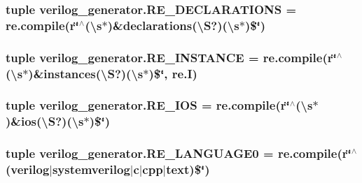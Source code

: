 \hypertarget{namespaceverilog__generator_a17458264d0df5cb836d925e8cf2ec56f}{
\subsubsection[{R\-E\-\_\-\-D\-E\-C\-L\-A\-R\-A\-T\-I\-O\-N\-S}]{\setlength{\rightskip}{0pt plus 5cm}tuple verilog\-\_\-generator.\-R\-E\-\_\-\-D\-E\-C\-L\-A\-R\-A\-T\-I\-O\-N\-S = re.\-compile(r\char`\"{}$^\wedge$(\textbackslash{}s$\ast$)\&declarations(\textbackslash{}S?)(\textbackslash{}s$\ast$)\$\char`\"{})}}\label{namespaceverilog__generator_a17458264d0df5cb836d925e8cf2ec56f}
\hypertarget{namespaceverilog__generator_ac2a164628a1ed9048df4807c3e001bd2}{
\subsubsection[{R\-E\-\_\-\-I\-N\-S\-T\-A\-N\-C\-E}]{\setlength{\rightskip}{0pt plus 5cm}tuple verilog\-\_\-generator.\-R\-E\-\_\-\-I\-N\-S\-T\-A\-N\-C\-E = re.\-compile(r\char`\"{}$^\wedge$(\textbackslash{}s$\ast$)\&{\bf instances}(\textbackslash{}S?)(\textbackslash{}s$\ast$)\$\char`\"{}, re.\-I)}}\label{namespaceverilog__generator_ac2a164628a1ed9048df4807c3e001bd2}
\hypertarget{namespaceverilog__generator_ac53d8e583f512c430c2e1c3ddff585e4}{
\subsubsection[{R\-E\-\_\-\-I\-O\-S}]{\setlength{\rightskip}{0pt plus 5cm}tuple verilog\-\_\-generator.\-R\-E\-\_\-\-I\-O\-S = re.\-compile(r\char`\"{}$^\wedge$(\textbackslash{}s$\ast$)\&{\bf ios}(\textbackslash{}S?)(\textbackslash{}s$\ast$)\$\char`\"{})}}\label{namespaceverilog__generator_ac53d8e583f512c430c2e1c3ddff585e4}
\hypertarget{namespaceverilog__generator_ada96a4c39f1929758761d6a64ad0c760}{
\subsubsection[{R\-E\-\_\-\-L\-A\-N\-G\-U\-A\-G\-E0}]{\setlength{\rightskip}{0pt plus 5cm}tuple verilog\-\_\-generator.\-R\-E\-\_\-\-L\-A\-N\-G\-U\-A\-G\-E0 = re.\-compile(r\char`\"{}$^\wedge$(verilog$|$systemverilog$|$c$|$cpp$|$text)\$\char`\"{})}}\label{namespaceverilog__generator_ada96a4c39f1929758761d6a64ad0c760}

